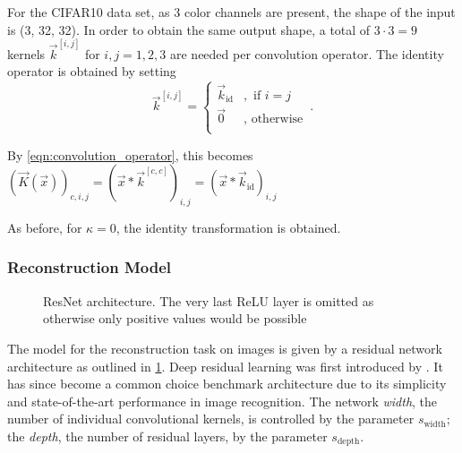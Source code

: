 For the CIFAR10 data set, as 3 color channels are present, the shape of the input is (3, 32, 32). 
In order to obtain the same output shape, 
a total of $3\cdot 3=9$ kernels $\vec k^{[i,j]}$ for $i,j=1,2,3$ are needed per convolution operator.
The identity operator is obtained by setting 
\[
    \vec k^{[i,j]} = \begin{cases}
        \vec k_{\text{id}} &, \text{ if } i = j\\
        \vec 0 &, \text{ otherwise} \\
    \end{cases} \,.
\]

By \cref{eqn:convolution_operator}, this becomes $(\vec K (\vec x))_{c,i,j}
    = \left ( \vec x * \vec k^{[c,c]} \right )_{i,j} = (\vec x * \vec k_\text{id})_{i, j}$


As before, for $\kappa = 0$, the identity transformation is obtained.


\subsubsection{Reconstruction Model}

\begin{figure}[!ht]
{\begin{minipage}{0.5\textwidth}
\centering

\end{minipage}
\hfill
\begin{minipage}{0.5\textwidth}
\centering

\end{minipage}}
\caption{ResNet architecture. The very last ReLU layer is omitted as otherwise only positive values would be possible}
\label{fig:resnet}
\end{figure}

The model for the reconstruction task on images is given by a residual network architecture
as outlined in \cref{fig:resnet}. 
Deep residual learning was first introduced by \cite{Resnet}.
It has since become a common choice benchmark architecture due to its simplicity and state-of-the-art performance
in image recognition.
The network \textit{width}, the number of individual convolutional kernels, is controlled by the parameter $s_\text{width}$; the \textit{depth}, the number of residual layers, by the parameter
$s_\text{depth}$.

